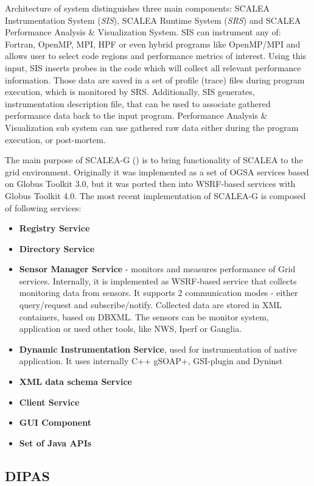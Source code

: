 Architecture of system distinguishes three main components: SCALEA Instrumentation System (\emph{SIS}),
SCALEA Runtime System (\emph{SRS}) and SCALEA
Performance Analysis \& Visualization System. SIS can instrument any of: Fortran, OpenMP, MPI, HPF or even
hybrid programs like OpenMP/MPI and allows user to select code regions and performance metrics of interest. Using this input, SIS inserts probes
in the code which will collect all relevant performance information. Those data are saved in a set of profile (trace) files during program execution,
which is monitored by SRS. Additionally, SIS generates,  instrumentation description file, that can be used to associate gathered performance data
back to the input program. Performance Analysis \& Visualization sub system can use gathered raw data either during the program execution, or
post-mortem.

The main purpose of SCALEA-G (\cite{SCALEA2, SCALEA3}) is to bring functionality of SCALEA to the grid
environment. Originally it was implemented as a set of OGSA services based on Globus Toolkit 3.0, but it was
ported then into WSRF-based services with Globus Toolkit 4.0. The most recent implementation of SCALEA-G is
composed of following services:

\begin{itemize}
\item{ {\bf Registry Service}}
\item{ {\bf Directory Service}}
\item{ {\bf Sensor Manager Service} - monitors and measures performance of Grid services. Internally, it is
implemented as WSRF-based service that collects monitoring data from sensors. It supports 2 communication
modes - either query/request and subscribe/notify. Collected data are stored in XML containers, based on DBXML.
The sensors can be monitor system, application or used other tools, like NWS, Iperf or Ganglia.}
\item{ {\bf Dynamic Instrumentation Service}, used for instrumentation of native application. It uses internally C++ gSOAP+, GSI-plugin and Dyninst}
\item{ {\bf XML data schema Service}}
\item{ {\bf Client Service}}
\item{ {\bf GUI Component}}
\item{ {\bf Set of Java APIs}}
\end{itemize}


\subsection{DIPAS}

